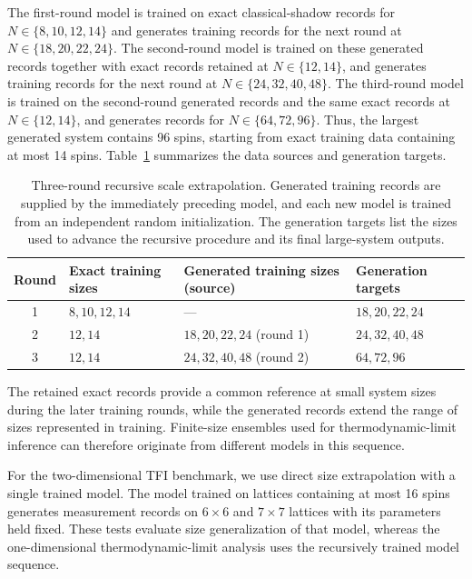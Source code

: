 \documentclass[pdflatex,sn-nature]{sn-jnl}%
\theoremstyle{thmstyleone}%
\theoremstyle{thmstyletwo}%
\theoremstyle{thmstylethree}%
\begin{document}
The first-round model is trained on exact classical-shadow records for \(N\in\{8,10,12,14\}\) and generates training records for the next round at \(N\in\{18,20,22,24\}\). The second-round model is trained on these generated records together with exact records retained at \(N\in\{12,14\}\), and generates training records for the next round at \(N\in\{24,32,40,48\}\). The third-round model is trained on the second-round generated records and the same exact records at \(N\in\{12,14\}\), and generates records for \(N\in\{64,72,96\}\). Thus, the largest generated system contains 96 spins, starting from exact training data containing at most 14 spins. Table~\ref{tab:recursive_schedule} summarizes the data sources and generation targets.

\begin{table}[t]
\centering
\small
\caption{
Three-round recursive scale extrapolation.
Generated training records are supplied by the immediately preceding
model, and each new model is trained from an independent random
initialization. The generation targets list the sizes used to advance
the recursive procedure and its final large-system outputs.
}
\label{tab:recursive_schedule}
\begin{tabular}{clll}
\hline
Round & Exact training sizes
& Generated training sizes (source)
& Generation targets \\
\hline
1 & \(8,10,12,14\)
& ---
& \(18,20,22,24\) \\
2 & \(12,14\)
& \(18,20,22,24\) (round 1)
& \(24,32,40,48\) \\
3 & \(12,14\)
& \(24,32,40,48\) (round 2)
& \(64,72,96\) \\
\hline
\end{tabular}
\end{table}

The retained exact records provide a common reference at small system sizes during the later training rounds, while the generated records extend the range of sizes represented in training. Finite-size ensembles used for thermodynamic-limit inference can therefore originate from different models in this sequence. 

For the two-dimensional TFI benchmark, we use direct size extrapolation with a single trained model. The model trained on lattices containing at most 16 spins generates measurement records on \(6\times6\) and \(7\times7\) lattices with its parameters held fixed. These tests evaluate size generalization of that model, whereas the one-dimensional thermodynamic-limit analysis uses the recursively trained model sequence.
\end{document}

